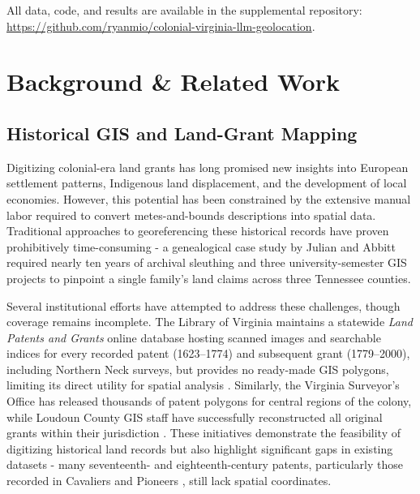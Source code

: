 All data, code, and results are available in the supplemental
repository:
\url{https://github.com/ryanmio/colonial-virginia-llm-geolocation}.

\section{Background \& Related Work}\label{background-related-work}

\subsection{Historical GIS and Land-Grant
Mapping}\label{historical-gis-and-land-grant-mapping}

Digitizing colonial-era land grants has long promised new insights into
European settlement patterns, Indigenous land displacement, and the
development of local economies. However, this potential has been
constrained by the extensive manual labor required to convert
metes-and-bounds descriptions into spatial data. Traditional approaches
to georeferencing these historical records have proven prohibitively
time-consuming - a genealogical case study by Julian and Abbitt
\citep{Julian2014_tennessee} required nearly ten years of archival
sleuthing and three university-semester GIS projects to pinpoint a
single family's land claims across three Tennessee counties.

Several institutional efforts have attempted to address these
challenges, though coverage remains incomplete. The Library of Virginia
maintains a statewide \emph{Land Patents and Grants} online database
hosting scanned images and searchable indices for every recorded patent
(1623--1774) and subsequent grant (1779--2000), including Northern Neck
surveys, but provides no ready-made GIS polygons, limiting its direct
utility for spatial analysis \citep{lva_patents_db}. Similarly, the
Virginia Surveyor's Office has released thousands of patent polygons for
central regions of the colony, while Loudoun County GIS staff have
successfully reconstructed all original grants within their jurisdiction
\citep{loudoun_grants_dataset}. These initiatives demonstrate the
feasibility of digitizing historical land records but also highlight
significant gaps in existing datasets - many seventeenth- and
eighteenth-century patents, particularly those recorded in Cavaliers and
Pioneers \citep{Nugent1979_cavaliers3}, still lack spatial coordinates.

